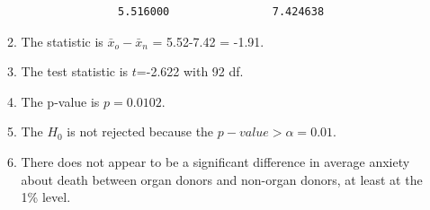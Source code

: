 \documentclass[10pt,openany]{book}\usepackage[]{graphicx}\usepackage[]{color}
\makeatletter
\newenvironment{kframe}{%
 \def\at@end@of@kframe{}%
 \ifinner\ifhmode%
  \def\at@end@of@kframe{\end{minipage}}%
  \begin{minipage}{\columnwidth}%
 \fi\fi%
 \def\FrameCommand##1{\hskip\@totalleftmargin \hskip-\fboxsep
 \colorbox{shadecolor}{##1}\hskip-\fboxsep
     \hskip-\linewidth \hskip-\@totalleftmargin \hskip\columnwidth}%
 \MakeFramed {\advance\hsize-\width
   \@totalleftmargin\z@ \linewidth\hsize
   \@setminipage}}%
 {\par\unskip\endMakeFramed%
 \at@end@of@kframe}
\newenvironment{knitrout}{}{} %
\makeatother
\begin{document}
\begin{itemize}
\begin{enumerate}
\begin{knitrout}
\begin{kframe}
\begin{verbatim}
               5.516000                7.424638 
\end{verbatim}
\end{kframe}
\end{knitrout}
      \item The statistic is $\bar{x}_{o}-\bar{x}_{n}$ = 5.52-7.42 = -1.91.
      \item The test statistic is $t$=-2.622 with 92 df.
      \item The p-value is $p=0.0102$.
      \item The $H_{0}$ is not rejected because the $p-value >\alpha=0.01$.
      \item There does not appear to be a significant difference in average anxiety about death between organ donors and non-organ donors, at least at the 1\% level.
    \end{enumerate}

\end{itemize}





\end{document}
